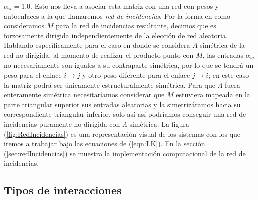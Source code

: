 $\alpha_{ii}=1.0$. Esto nos lleva a asociar esta matriz con una red con pesos y autoenlaces a la que llamaremos \textit{red de incidencias}. Por la forma en como consideramos $M$ para la red de incidencias resultante, decimos que es forzosamente dirigida independientemente de la elección de red aleatoria. Hablando específicamente para el caso en donde se considera $A$ simétrica de la red no dirigida, al momento de realizar el producto punto con $M$, las entradas $\alpha_{ij}$ no necesariamente son iguales a su contraparte simétrica, por lo que se tendrá un peso para el enlace $i\to j$ y otro peso diferente para el enlace $j\to i$; en este caso la matriz podrá ser únicamente estructuralmente simétrica. Para que $\Lambda$ fuera enteramente simétrica necesitaríamos considerar que $M$ estuviera mapeada en la parte triangular superior sus entradas aleatorias y la simetrizáramos hacia su correspondiente triangular inferior, solo así así podríamos conseguir una red de incidencias puramente no dirigida con $\Lambda$ simétrica. La figura (\ref{fig:RedIncidencias}) es una representación visual de los sistemas con los que iremos a trabajar bajo las ecuaciones de (\ref{eqn:LK}). En la sección (\ref{sec:redIncidencias}) se muestra la implementación computacional de la red de incidencias.

\subsection{Tipos de interacciones}

